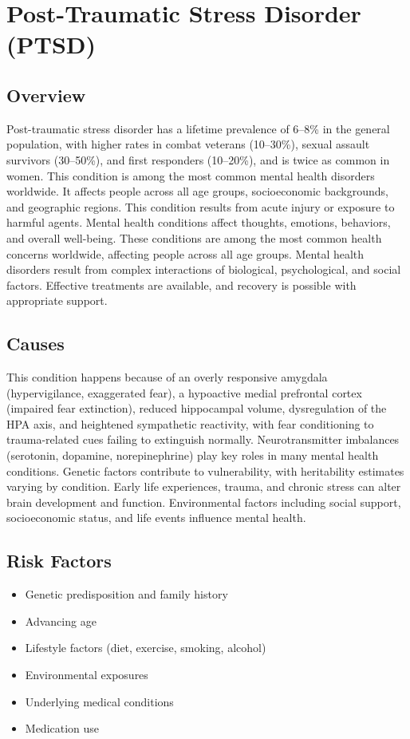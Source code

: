 \chapter{Post-Traumatic Stress Disorder (PTSD)}
\label{sec:Post-Traumatic Stress Disorder (PTSD)}

\section{Overview}
Post-traumatic stress disorder has a lifetime prevalence of 6--8\% in the general population, with higher rates in combat veterans (10--30\%), sexual assault survivors (30--50\%), and first responders (10--20\%), and is twice as common in women. This condition is among the most common mental health disorders worldwide. It affects people across all age groups, socioeconomic backgrounds, and geographic regions. This condition results from acute injury or exposure to harmful agents. Mental health conditions affect thoughts, emotions, behaviors, and overall well-being. These conditions are among the most common health concerns worldwide, affecting people across all age groups. Mental health disorders result from complex interactions of biological, psychological, and social factors. Effective treatments are available, and recovery is possible with appropriate support.
\section{Causes}
This condition happens because of an overly responsive amygdala (hypervigilance, exaggerated fear), a hypoactive medial prefrontal cortex (impaired fear extinction), reduced hippocampal volume, dysregulation of the HPA axis, and heightened sympathetic reactivity, with fear conditioning to trauma-related cues failing to extinguish normally.  Neurotransmitter imbalances (serotonin, dopamine, norepinephrine) play key roles in many mental health conditions. Genetic factors contribute to vulnerability, with heritability estimates varying by condition. Early life experiences, trauma, and chronic stress can alter brain development and function. Environmental factors including social support, socioeconomic status, and life events influence mental health.   
\section{Risk Factors}
\begin{itemize}[noitemsep]
  \item Genetic predisposition and family history
  \item Advancing age
  \item Lifestyle factors (diet, exercise, smoking, alcohol)
  \item Environmental exposures
  \item Underlying medical conditions
  \item Medication use
\end{itemize}
